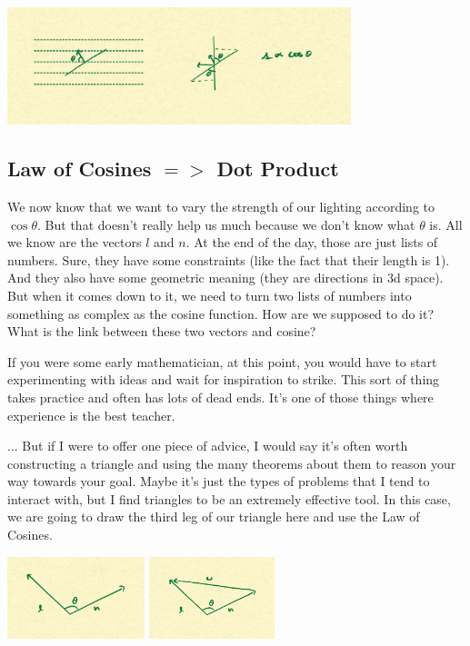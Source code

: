 \documentclass{article}
\begin{document}
\begin{center}
	\includegraphics[width=0.75\textwidth,frame]{assets/cosine.jpg}
\end{center}

\subsection{Law of Cosines $=>$ Dot Product}

We now know that we want to vary the strength of our lighting according to $\cos \theta$.
But that doesn't really help us much because we don't know what $\theta$ is.
All we know are the vectors $l$ and $n$.
At the end of the day, those are just lists of numbers.
Sure, they have some constraints (like the fact that their length is 1).
And they also have some geometric meaning (they are directions in 3d space).
But when it comes down to it, we need to turn two lists of numbers into something as complex as the cosine function.
How are we supposed to do it?
What is the link between these two vectors and cosine?

If you were some early mathematician, at this point, you would have to start experimenting with ideas and wait for inspiration to strike.
This sort of thing takes practice and often has lots of dead ends.
It's one of those things where experience is the best teacher.

... But if I were to offer one piece of advice, I would say it's often worth constructing a triangle and using the many theorems about them to reason your way towards your goal.
Maybe it's just the types of problems that I tend to interact with, but I find triangles to be an extremely effective tool.
In this case, we are going to draw the third leg of our triangle here and use the Law of Cosines.

\begin{center}
	\includegraphics[width=0.3\textwidth,frame]{assets/ln.jpg}
	\hspace{0.2\textwidth}
	\includegraphics[width=0.2735\textwidth,frame]{assets/lnw.jpg}
\end{center}
\end{document}
